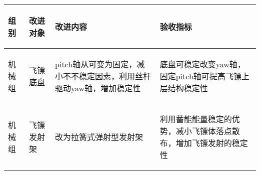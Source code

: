 
\begin{longtable}{ p{1.5cm} | p{3cm} | p{6cm} | p{4.3cm} |}

    \hline

    \endfoot
    
    \rowcolor{tabhdcolor}

        \begin{center}
            组别
        \end{center} &
        \begin{center}
            改进对象
        \end{center} &
        \begin{center}
            改进内容
        \end{center} &
        \begin{center}
            验收指标
        \end{center}\\

    \hline

    \endhead

        \begin{center}
            机械组
        \end{center} &
        \begin{center}
            飞镖底盘
        \end{center} &
        \begin{center}
            pitch轴从可变为固定，减小不不稳定因素，利用丝杆驱动yaw轴，增加稳定性
        \end{center} &
        \begin{center}
            底盘可稳定改变yaw轴，固定pitch轴可提高飞镖上层结构稳定性
        \end{center}\\
        
    \hline
        \begin{center}
            机械组
        \end{center}&
        \begin{center}
            飞镖发射架
        \end{center}&
        \begin{center}
            改为拉簧式弹射型发射架
        \end{center}&
        \begin{center}
            利用蓄能能量稳定的优势，减小飞镖体落点散布，增加飞镖发射的稳定性
        \end{center}\\
        

\end{longtable}
